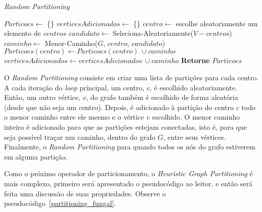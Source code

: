 \begin{algorithm}                   %
	\caption{\textit{Random Partitioning}}          %
	\label{partitioning_random}                           %
	\begin{algorithmic}                    %
		\newline
		\State $Particoes \gets $ \{\}
		\State $verticesAdicionados \gets $ \{\}
		\Repeat
			\State $centro \gets $ escolhe aleatoriamente um elemento de $centros$
			\State $candidato \gets $ Seleciona-Aleatoriamente($V - centros$) 
			\State $caminho \gets $ Menor-Caminho($G$, $centro$, $candidato$)
			\State $Particoes(centro) \gets Particoes(centro)\ \cup caminho$
			\State $verticesAdicionados \gets verticesAdicionados\ \cup caminho$
		\State \textbf{Retorne} $Particoes$
		\EndProcedure
	\end{algorithmic}
\end{algorithm}

O \textit{Random Partitioning} consiste em criar uma lista de partições para 
cada centro. A cada iteração do \textit{loop} principal, um centro, $c$, é escolhido 
aleatoriamente. Então, um outro vértice, $v$, do grafo também é escolhido de forma 
aleatória (desde que não seja um centro). Depois, é adicionado à partição 
do centro $c$ todo o menor caminho entre ele mesmo e o vértice $v$ 
escolhido. O menor caminho inteiro é adicionado para que as partições estejam 
conectadas, isto é, para que seja possível traçar um caminho, dentro do grafo 
$G$, entre seus vértices. Finalmente, o \textit{Random Partitioning} para quando 
todos os nós do grafo estiverem em alguma partição.

Como o próximo operador de particionamento, o 
\textit{Heuristic Graph Partitioning} é mais complexo, primeiro será apresentado 
o pseudocódigo ao leitor, e então será feita uma discussão de suas propriedades. 
Observe o pseudocódigo~\ref{partitioning_fungal}.

